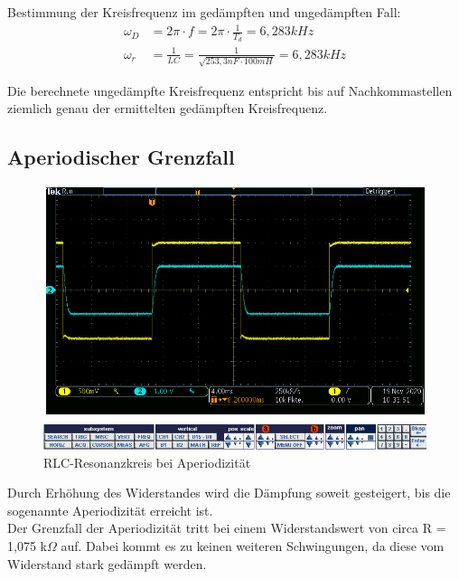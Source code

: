 \documentclass{article}
\begin{document}
Bestimmung der Kreisfrequenz im gedämpften und ungedämpften Fall: 
\begin{align*}
\omega_D   & = 2\pi \cdot f = 2\pi \cdot \frac{1}{T_d} = 6,283kHz \\
\omega_r   & = \frac{1}{LC} = \frac{1}{\sqrt{253,3nF \cdot 100mH}} = 6,283kHz
\end{align*}

Die berechnete ungedämpfte Kreisfrequenz entspricht bis auf Nachkommastellen ziemlich genau der ermittelten gedämpften Kreisfrequenz.

\subsection{Aperiodischer Grenzfall}

\begin{figure}[h]
  \begin{center}
    \includegraphics[scale=0.5]{../assets/images/ETP3/Aufgabe2AperiodischerGrenzfall.PNG}
    \caption{RLC-Resonanzkreis bei Aperiodizität}
  \end{center}
\end{figure}

Durch Erhöhung des Widerstandes wird die Dämpfung soweit gesteigert, bis die sogenannte Aperiodizität erreicht ist.\\
Der Grenzfall der Aperiodizität tritt bei einem Widerstandswert von circa R = 1,075 k$\Omega$ auf.
Dabei kommt es zu keinen weiteren Schwingungen, da diese vom Widerstand stark gedämpft werden.
\end{document}
